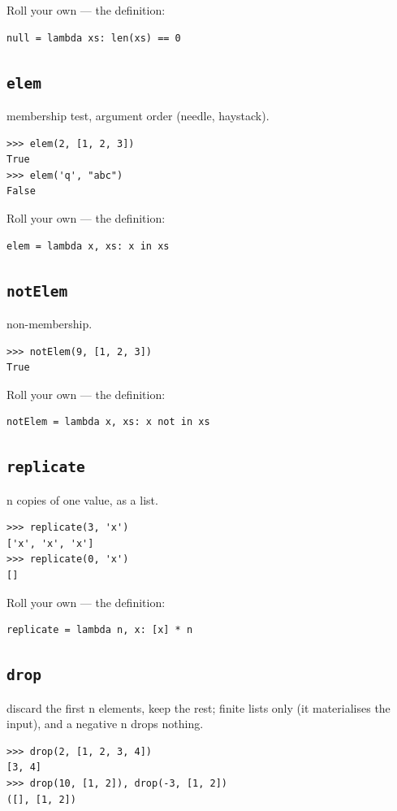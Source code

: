 \documentclass[10pt,letterpaper]{book}
\begin{document}
Roll your own --- the definition:

\begin{lstlisting}[style=ex]
null = lambda xs: len(xs) == 0
\end{lstlisting}
\subsection{\texttt{elem}}\label{def:elem}
membership test, argument order (needle, haystack).
\begin{lstlisting}[style=ex]
>>> elem(2, [1, 2, 3])
True
>>> elem('q', "abc")
False
\end{lstlisting}

Roll your own --- the definition:

\begin{lstlisting}[style=ex]
elem = lambda x, xs: x in xs
\end{lstlisting}
\subsection{\texttt{notElem}}\label{def:notElem}
non-membership.
\begin{lstlisting}[style=ex]
>>> notElem(9, [1, 2, 3])
True
\end{lstlisting}

Roll your own --- the definition:

\begin{lstlisting}[style=ex]
notElem = lambda x, xs: x not in xs
\end{lstlisting}
\subsection{\texttt{replicate}}\label{def:replicate}
n copies of one value, as a list.
\begin{lstlisting}[style=ex]
>>> replicate(3, 'x')
['x', 'x', 'x']
>>> replicate(0, 'x')
[]
\end{lstlisting}

Roll your own --- the definition:

\begin{lstlisting}[style=ex]
replicate = lambda n, x: [x] * n
\end{lstlisting}
\subsection{\texttt{drop}}\label{def:drop}
discard the first n elements, keep the rest; finite lists only (it materialises the input), and a negative n drops nothing.
\begin{lstlisting}[style=ex]
>>> drop(2, [1, 2, 3, 4])
[3, 4]
>>> drop(10, [1, 2]), drop(-3, [1, 2])
([], [1, 2])
\end{lstlisting}
\end{document}
